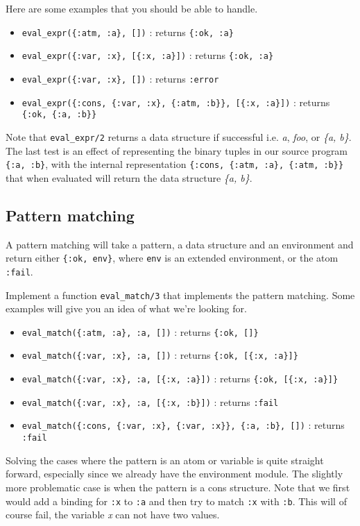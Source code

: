 \documentclass[a4paper,11pt]{article}
\begin{document}
Here are some examples that you should be able to handle.

\begin{itemize}
\item {\tt eval\_expr(\{:atm, :a\}, [])} : returns {\tt \{:ok, :a\}}
 \item {\tt eval\_expr(\{:var, :x\},  [\{:x, :a\}])} : returns {\tt \{:ok, :a\}}
 \item {\tt eval\_expr(\{:var, :x\},  [])} : returns {\tt :error}
 \item {\tt eval\_expr(\{:cons, \{:var, :x\}, \{:atm, :b\}\},  [\{:x, :a\}])} : returns {\tt \{:ok, \{:a, :b\}\}} 
\end{itemize}

Note that {\tt eval\_expr/2} returns a data structure if successful
i.e. {\em a}, {\em foo}, or {\em \{a, b\}}.  The last test is an
effect of representing the binary tuples in our source program {\tt
  \{:a, :b\}}, with the internal representation {\tt \{:cons, \{:atm,
  :a\}, \{:atm, :b\}\}} that when evaluated will return the
data structure {\em \{a, b\}}.

\subsection{Pattern matching}
A pattern matching will take a pattern, a data structure and an
environment and return either {\tt \{:ok, env\}}, where {\tt env} is an
extended environment, or the atom {\tt :fail}. 

Implement a function {\tt eval\_match/3} that implements
the pattern matching. Some examples will give you an idea of what
we're looking for.

\begin{itemize}
 \item {\tt eval\_match(\{:atm, :a\}, :a, [])} : returns {\tt \{:ok, []\}}
 \item {\tt eval\_match(\{:var, :x\}, :a, [])} : returns {\tt \{:ok, [\{:x, :a\}]\}}
 \item {\tt eval\_match(\{:var, :x\}, :a, [\{:x, :a\}])} : returns {\tt \{:ok, [\{:x, :a\}]\}}
 \item {\tt eval\_match(\{:var, :x\}, :a, [\{:x, :b\}])} : returns {\tt :fail}
 \item {\tt eval\_match(\{:cons, \{:var, :x\}, \{:var, :x\}\}, \{:a, :b\}, [])} : returns {\tt :fail}
\end{itemize}

Solving the cases where the pattern is an atom or variable is quite
straight forward, especially since we already have the environment
module. The slightly more problematic case is when the pattern is a
cons structure. Note that we first would add a binding for {\tt :x} to
{\tt :a} and then try to match {\tt :x} with {\tt :b}. This will of
course fail, the variable {\em x} can not have two values.
\end{document}
